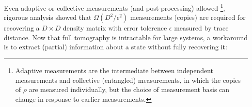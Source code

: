 \documentclass[
aps,
pra,
twocolumn,
floatfix,
]{revtex4-2}
\theoremstyle{plain}
\theoremstyle{definition}
\newtheorem{problem}{Problem}
\newcommand{\ob}{O}
\newcommand{\dm}{\rho}
\newcommand{\bmsigma}{\bm{\sigma}}
\begin{document}
Even adaptive or collective measurements (and post-processing) allowed 
\footnote{Adaptive measurements are the intermediate between independent measurements and collective (entangled) measurements, in which the copies of $\dm$ are measured individually, but the choice of measurement basis can change in response to earlier measurements.},
rigorous analysis \cite{haahSampleoptimalTomographyQuantum2017} \cite{odonnellEfficientQuantumTomography2016} showed that 
$\Omega(D^2/\epsilon^2)$ measurements (copies)  are required for recovering a $D\times D$ density matrix
with error tolerence $\epsilon$ measured by trace distance.
Now that full tomography is intractable for large systems, a workaround is to extract (partial) information about a state without fully recovering it:
\end{document}
